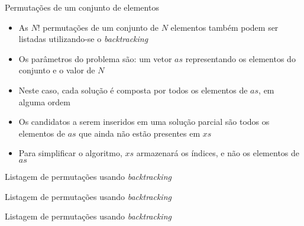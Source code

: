 \begin{frame}[fragile]{Permutações de um conjunto de elementos}

    \begin{itemize}
        \item As $N!$ permutações de um conjunto de $N$ elementos também podem ser
            listadas utilizando-se o \textit{backtracking}

        \item Os parâmetros do problema são: um vetor $as$ representando os elementos do
            conjunto e o valor de $N$

        \item Neste caso, cada solução é composta por todos os elementos de $as$, em alguma ordem

        \item Os candidatos a serem inseridos em uma solução parcial são todos os elementos de
            $as$ que ainda não estão presentes em $xs$

        \item Para simplificar o algoritmo, $xs$ armazenará os índices, e não os elementos de
            $as$
    \end{itemize}

\end{frame}

\begin{frame}[fragile]{Listagem de permutações usando {\it backtracking}}
\end{frame}

\begin{frame}[fragile]{Listagem de permutações usando {\it backtracking}}
\end{frame}

\begin{frame}[fragile]{Listagem de permutações usando {\it backtracking}}
\end{frame}

